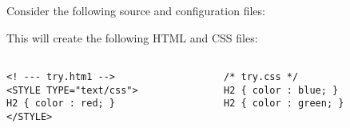 Consider the following source and configuration files: 


This will create the following HTML and CSS files: 

\begin{verbatim}

<! --- try.htm1 -->                   /* try.css */ 
<STYLE TYPE="text/css">               H2 { color : blue; } 
H2 { color : red; }                   H2 { color : green; } 
</STYLE> 

\end{verbatim}
